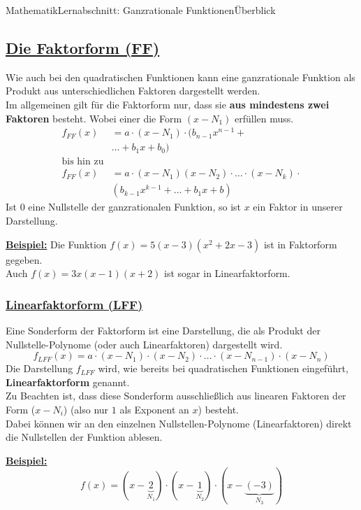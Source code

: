 \documentclass[11pt,twocolumn,oneside,openany,headings=optiontotoc,11pt,numbers=noenddot]{article}
\begin{document}
\begin{worksheet}{Mathematik}{Lernabschnitt: Ganzrationale Funktionen}{Überblick}
		\subsection*{\underline{Die Faktorform (FF)}}
		Wie auch bei den quadratischen Funktionen kann eine ganzrationale Funktion als Produkt aus unterschiedlichen Faktoren dargestellt werden.\\
		Im allgemeinen gilt für die Faktorform nur, dass sie \textbf{aus mindestens zwei Faktoren} besteht. Wobei einer die Form \((x-N_1)\) erfüllen muss.
		\begin{align*}
			f_{FF}(x) & = a\cdot{}(x-N_1)\cdot{}(b_{n-1}x^{n-1}+\\
			&\ldots{}+b_1x+ b_0)\\
			\text{bis hin zu}\\
			f_{FF}(x) & = a\cdot{}(x-N_1)(x-N_2)\cdot{}\ldots{}\cdot{}(x-N_k)\cdot\\
			&(b_{k-1}x^{k-1} + \ldots + b_1x + b)
		\end{align*}
		Ist \(0\) eine Nullstelle der ganzrationalen Funktion, so ist \(x\) ein Faktor in unserer Darstellung.\\
		\par\noindent
		\textbf{\underline{Beispiel:}} Die Funktion \(f(x) = 5(x-3)(x^2+2x-3)\) ist in Faktorform gegeben.\\
		Auch \(f(x) = 3x(x-1)(x+2)\) ist sogar in Linearfaktorform.
		\subsubsection*{\underline{Linearfaktorform (LFF)}}
		Eine Sonderform der Faktorform ist eine Darstellung, die als Produkt der \grq{}Nullstelle-Polynome\grq{} (oder auch Linearfaktoren) dargestellt wird.
		\[f_{LFF}(x) = a\cdot{}(x-N_1)\cdot{}(x-N_2)\cdot{}\ldots{}\cdot{}(x-N_{n-1})\cdot{}(x-N_n)\]
		Die Darstellung \(f_{LFF}\) wird, wie bereits bei quadratischen Funktionen eingeführt, \textbf{Linearfaktorform} genannt.\\
		Zu Beachten ist, dass diese Sonderform ausschließlich aus linearen Faktoren der Form (\(x-N_i\)) (also nur \(1\) als Exponent an \(x\)) besteht.\\
		Dabei können wir an den einzelnen \grq{}Nullstellen-Polynome\grq{} (Linearfaktoren) direkt die Nullstellen der Funktion ablesen.\\
		\par\noindent
		\underline{\textbf{Beispiel:}}\[f(x) = (x-\underbrace{2}_{N_1})\cdot(x-\underbrace{1}_{N_2})\cdot(x-\underbrace{(-3)}_{N_3})\]

\end{worksheet}
\end{document}
